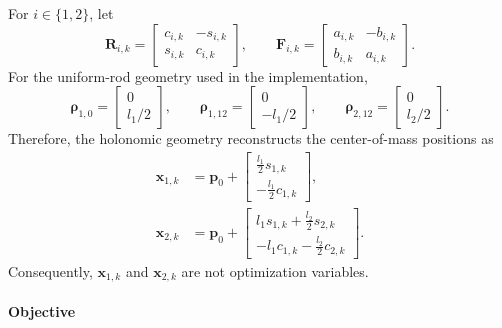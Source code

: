 For $i\in\{1,2\}$, let
\begin{equation}
\bm{R}_{i,k}=
\begin{bmatrix}
c_{i,k}&-s_{i,k}\\
s_{i,k}& c_{i,k}
\end{bmatrix},
\qquad
\bm{F}_{i,k}=
\begin{bmatrix}
a_{i,k}&-b_{i,k}\\
b_{i,k}& a_{i,k}
\end{bmatrix}.
\label{eq:app_acrobot_scalar_rotations}
\end{equation}
For the uniform-rod geometry used in the implementation,
\begin{equation}
\bm{\rho}_{1,0}=\begin{bmatrix}0\\ l_1/2\end{bmatrix},
\qquad
\bm{\rho}_{1,12}=\begin{bmatrix}0\\-l_1/2\end{bmatrix},
\qquad
\bm{\rho}_{2,12}=\begin{bmatrix}0\\ l_2/2\end{bmatrix}.
\label{eq:app_acrobot_geometry_vectors}
\end{equation}
Therefore, the holonomic geometry reconstructs the center-of-mass positions as
\begin{subequations}
\label{eq:app_acrobot_reconstructed_positions}
\begin{align}
\bm{x}_{1,k}
&=\bm{p}_0+
\begin{bmatrix}
\frac{l_1}{2}s_{1,k}\\[0.1em]
-\frac{l_1}{2}c_{1,k}
\end{bmatrix},
\label{eq:app_acrobot_reconstructed_x1}\\
\bm{x}_{2,k}
&=\bm{p}_0+
\begin{bmatrix}
l_1s_{1,k}+\frac{l_2}{2}s_{2,k}\\[0.1em]
-l_1c_{1,k}-\frac{l_2}{2}c_{2,k}
\end{bmatrix}.
\label{eq:app_acrobot_reconstructed_x2}
\end{align}
\end{subequations}
Consequently, \(\bm{x}_{1,k}\) and \(\bm{x}_{2,k}\) are not optimization variables.

\paragraph{Objective}

